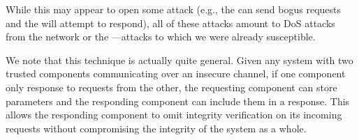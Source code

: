 While this may appear to open some attack (e.g., the \medname can send bogus requests and the \encname will attempt to respond),
all of these attacks amount to DoS attacks from the network or the \medname---attacks to which we were already susceptible.

We note that this technique is actually quite general.
Given any system with two trusted components communicating over an insecure channel, if one component only response to requests from the other,
the requesting component can store parameters and the responding component can include them in a response.
This allows the responding component to omit integrity verification on its incoming requests without compromising the integrity of the system as a whole.






